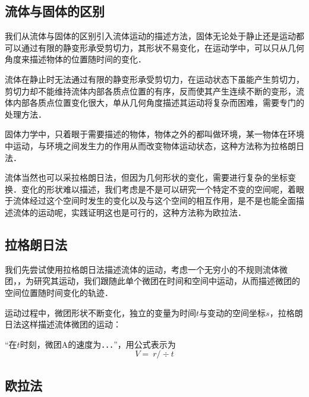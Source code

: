 \subsection{流体与固体的区别}
我们从流体与固体的区别引入流体运动的描述方法，固体无论处于静止还是运动都可以通过有限的静变形承受剪切力，其形状不易变化，在运动学中，可以只从几何角度来描述物体的位置随时间的变化．

流体在静止时无法通过有限的静变形承受剪切力，在运动状态下虽能产生剪切力，剪切力却不能维持流体内部各质点位置的有序，反而使其产生连续不断的变形，流体内部各质点位置变化很大，单从几何角度描述其运动将复杂而困难，需要专门的处理方法．

固体力学中，只着眼于需要描述的物体，物体之外的都叫做环境，某一物体在环境中运动，与环境之间发生力的作用从而改变物体运动状态，这种方法称为拉格朗日法．

流体当然也可以采拉格朗日法，但因为几何形状的变化，需要进行复杂的坐标变换．变化的形状难以描述，我们考虑是不是可以研究一个特定不变的空间呢，着眼于流体经过这个空间时发生的变化以及与这个空间的相互作用，是不是也能全面描述流体的运动呢，实践证明这也是可行的，这种方法称为欧拉法．

\subsection{拉格朗日法}
我们先尝试使用拉格朗日法描述流体的运动，考虑一个无穷小的不规则流体微团，，为研究其运动，我们跟随此单个微团在时间和空间中运动，从而描述微团的空间位置随时间变化的轨迹．

运动过程中，微团形状不断变化，独立的变量为时间$t$与变动的空间坐标$s$，拉格朗日法这样描述流体微团的运动：

“在$t$时刻，微团A的速度为．．．”，用公式表示为
\begin{equation}
V=\ r/\div t
\end{equation}


\subsection{欧拉法}
